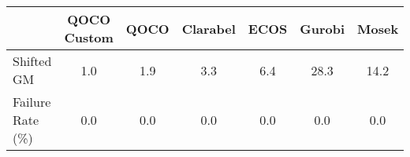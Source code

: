 \begin{tabular}{lcccccc}
  \hline
    & \textbf{QOCO Custom}   & \textbf{QOCO} & \textbf{Clarabel} & \textbf{ECOS} & \textbf{Gurobi} & \textbf{Mosek} \\ \hline
  Shifted GM & 1.0 & 1.9 & 3.3 & 6.4 & 28.3 & 14.2 \\ 
  Failure Rate (\%) & 0.0 & 0.0 & 0.0 & 0.0 & 0.0 & 0.0 \\ \hline 
\end{tabular}
